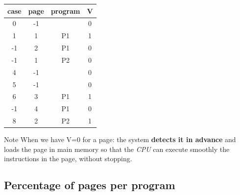 \documentclass{beamer}[10pt, usepdftitle=false, handout]
\begin{document}
	\begin{frame}
	
		\begin{center}
	\begin{tabular}{|c|c|c|c|}
	\hline
	case & page & program & V\\ \hline
	0 & -1 & & 0\\ \hline
	1 & 1 & P1 & 1\\ \hline
	-1 & 2 & P1 & 0\\ \hline
	-1 & 1 & P2 & 0\\ \hline
	4 & -1 & & 0\\ \hline
	5 & -1 & & 0\\ \hline
	6 & 3 & P1 & 1 \\ \hline
	-1 & 4 & P1 & 0 \\ \hline
	8 & 2 & P2 & 1\\ \hline
	
	\end{tabular}	
	\end{center}	
	
	
	\vspace*{1em}	
	\begin{block}{Note}
	When we have V=0 for a page: the system \textbf{detects it in advance} and loads the page in main memory so that the \textit{CPU} can execute smoothly the instructions in the page, without stopping.
	\end{block}
	
	
	\end{frame}		
	
	\subsection{Percentage of pages per program}	
			
\end{document}
